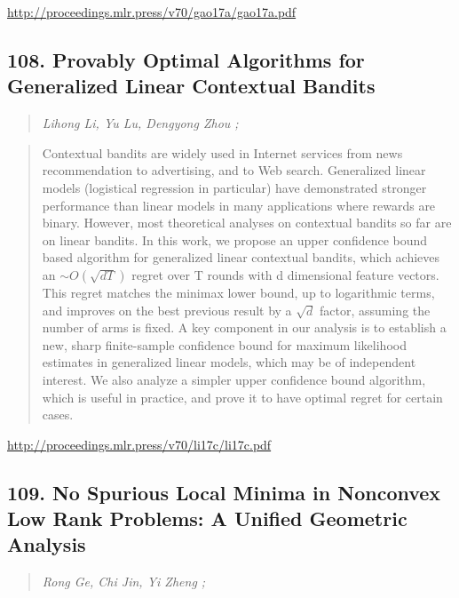 \documentclass{article}
\begin{document}
\href{http://proceedings.mlr.press/v70/gao17a/gao17a.pdf}{http://proceedings.mlr.press/v70/gao17a/gao17a.pdf}

\subsection{108. Provably Optimal Algorithms for Generalized Linear Contextual Bandits}

\begin{quote}
\footnotesize{\textit{Lihong Li, Yu Lu, Dengyong Zhou ;}}
\end{quote}

\begin{quote}
    Contextual bandits are widely used in Internet services from news recommendation to advertising, and to Web search. Generalized linear models (logistical regression in particular) have demonstrated stronger performance than linear models in many applications where rewards are binary. However, most theoretical analyses on contextual bandits so far are on linear bandits. In this work, we propose an upper confidence bound based algorithm for generalized linear contextual bandits, which achieves an $\sim O(\sqrt{dT})$ regret over T rounds with d dimensional feature vectors. This regret matches the minimax lower bound, up to logarithmic terms, and improves on the best previous result by a $\sqrt{d}$ factor, assuming the number of arms is fixed. A key component in our analysis is to establish a new, sharp finite-sample confidence bound for maximum likelihood estimates in generalized linear models, which may be of independent interest. We also analyze a simpler upper confidence bound algorithm, which is useful in practice, and prove it to have optimal regret for certain cases.  \end{quote}

\href{http://proceedings.mlr.press/v70/li17c/li17c.pdf}{http://proceedings.mlr.press/v70/li17c/li17c.pdf}

\subsection{109. No Spurious Local Minima in Nonconvex Low Rank Problems: A Unified Geometric Analysis}

\begin{quote}
\footnotesize{\textit{Rong Ge, Chi Jin, Yi Zheng ;}}
\end{quote}
\end{document}
